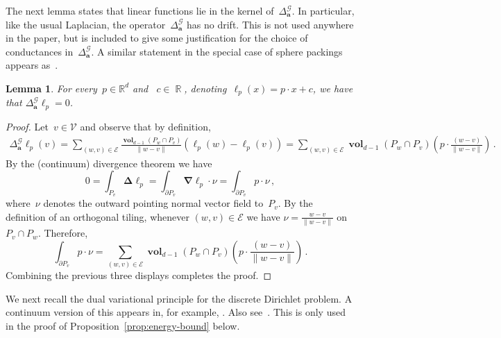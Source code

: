 \documentclass[12pt]{amsart}
\numberwithin{equation}{section}
\DeclareMathOperator{\R}{\mathbb{R}}
\newtheorem{lemma}[theorem]{Lemma}
\newcommand*{\Rd}{\ensuremath{\mathbb{R}^d}}
\newcommand{\V}{\mathcal{V}}
\newcommand{\E}{\mathcal{E}}
\newcommand{\CLap}{\boldsymbol{\Delta}}
\newcommand{\Cnabla}{\boldsymbol{\nabla}}
\newcommand{\aDelta}{\hyperref[eq:geometric-laplacian]{{\Delta^{\mathcal{G}}_{\cond}}}}
\newcommand{\cond}{\hyperref[eq:geometric-laplacian]{\mathbf{a}}}
\DeclareMathOperator{\vol}{\mathbf{vol}}
\begin{document}
The next lemma states that linear functions lie in the kernel of~$\aDelta$. In particular, like the usual Laplacian, the operator~$\aDelta$ has no drift.
This is not used anywhere in the paper, but is included to give some justification for the choice of conductances in~$\aDelta$.
A similar statement in the special case of sphere packings appears as~\cite[Proposition 6.4]{MR4425348}.
\begin{lemma} \label{lemma:linear-lie-in-kernel}
	For every~$p \in \Rd$ and ~$c \in \R$, denoting~$\ell_p(x) = p \cdot x + c$, we have that $\aDelta \ell_p = 0$. 
\end{lemma}
\begin{proof}
	Let~$v \in \V$ and observe that by definition, 
	\begin{align*}
		\aDelta \ell_p(v) = \sum_{(w,v) \in \E} \frac{\vol_{d-1}(P_w \cap P_v)}{\|w - v\|} (\ell_p(w) - \ell_p(v))
		= 
				\sum_{(w,v) \in \E} \vol_{d-1}(P_w \cap P_v) \left( p \cdot \frac{(w-v)}{\|w - v\|} \right)\, . 
	\end{align*}
	By the (continuum) divergence theorem we have
	\[
	0 = \int_{P_v} \CLap \ell_p  = \int_{\partial P_v} \Cnabla \ell_p \cdot \nu
	= \int_{\partial P_v} p \cdot \nu 
	   \, , 
	\]
	where~$\nu$ denotes the outward pointing normal vector field to~$P_v$. By the definition of an orthogonal tiling, whenever $(w,v) \in \E$ we have $\nu = \frac{w-v}{\|w-v\|}$ on $P_v \cap P_w$. Therefore,
	\[
	\int_{\partial P_v} p \cdot \nu  = 	\sum_{(w,v) \in \E} \vol_{d-1}(P_w \cap P_v) \left( p \cdot \frac{(w-v)}{\|w - v\|} \right)\,.  
	\]
	Combining the previous three displays completes the proof. 
\end{proof}



We next recall the dual variational principle for the discrete Dirichlet problem. A continuum version of this appears in, for example, \cite[Section 8.7, Exercise 13]{evans2022partial}. Also see~\cite[Proposition 4.9]{gurel2020dirichlet}. This is only used in the proof of Proposition~\ref{prop:energy-bound} below.
 
\end{document}
